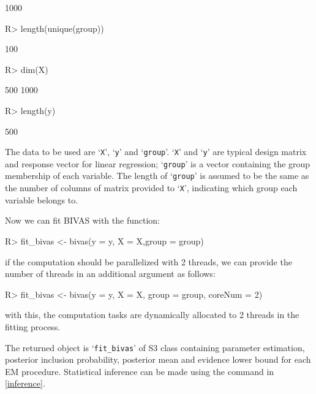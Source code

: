 \documentclass[11pt]{article}
\begin{document}
\begin{Schunk}
\begin{Soutput}
[1] 1000
\end{Soutput}
\begin{Sinput}
R> length(unique(group))
\end{Sinput}
\begin{Soutput}
[1] 100
\end{Soutput}
\begin{Sinput}
R> dim(X)
\end{Sinput}
\begin{Soutput}
[1]  500 1000
\end{Soutput}
\begin{Sinput}
R> length(y)
\end{Sinput}
\begin{Soutput}
[1] 500
\end{Soutput}
\end{Schunk}

The data to be used are `\texttt{X}', `\texttt{y}' and `\texttt{group}'. `\texttt{X}' and `\texttt{y}' are typical design matrix and response vector for linear regression; `\texttt{group}' is a vector containing the group membership of each variable. The length of `\texttt{group}' is assumed to be the same as the number of columns of matrix provided to `\texttt{X}', indicating which group each variable belongs to.

Now we can fit BIVAS with the function:
\begin{Schunk}
\begin{Sinput}
R> fit_bivas <- bivas(y = y, X = X,group = group)
\end{Sinput}
\end{Schunk}
if the computation should be parallelized with 2 threads, we can provide the number of threads in an additional argument as follows:
\begin{Schunk}
\begin{Sinput}
R> fit_bivas <- bivas(y = y, X = X, group = group, coreNum = 2)
\end{Sinput}
\end{Schunk}
with this, the computation tasks are dynamically allocated to 2 threads in the fitting process.

The returned object is `\texttt{fit\_bivas}' of S3 class containing parameter estimation, posterior inclusion probability, posterior mean and evidence lower bound for each EM procedure. Statistical inference can be made using the command in \ref{inference}.
\end{document}
